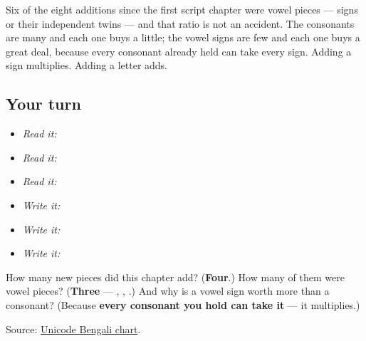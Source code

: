 Six of the eight additions since the first script chapter were vowel pieces — signs or their independent twins — and that ratio is not an accident. The consonants are many and each one buys a little; the vowel signs are few and each one buys a great deal, because every consonant already held can take every sign. Adding a sign multiplies. Adding a letter adds.

\subsection*{Your turn}
\begin{itemize}
\raggedright
  \item \emph{Read it:}    
  \item \emph{Read it:} 
  \item \emph{Read it:}  
  \item \emph{Write it:} 
  \item \emph{Write it:} 
  \item \emph{Write it:}  
\end{itemize}

\begin{tcolorbox}[breakable,colback=teal!4,colframe=teal!35!black,title={Before you move on}]
How many new pieces did this chapter add? (\textbf{Four}.) How many of them were vowel pieces? (\textbf{Three} — \textbf{}, \textbf{}, \textbf{}.) And why is a vowel sign worth more than a consonant? (Because \textbf{every consonant you hold can take it} — it multiplies.)

Source: \href{https://www.unicode.org/charts/PDF/U0980.pdf}{Unicode Bengali chart}.
\end{tcolorbox}
